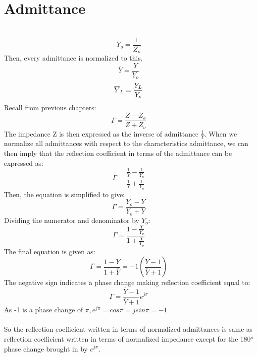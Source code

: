      \section{Admittance}\\
\begin{equation}
Y_o= \frac{1}{Z_o}
\end{equation}
Then, every admittance is normalized to this,
\begin{equation*}
\overline{Y} = \frac{Y}{Y_o} 
\end{equation*}
\begin{equation*}
\space  \overline{Y}_L = \frac{Y_L}{Y_o}
\end{equation*}
Recall from previous chapters:
\begin{equation*}
\Gamma = \frac{Z-Z_o}{Z+Z_o} 
\end{equation*}
The impedance Z is then expressed as the inverse of admittance $\frac{1}{Y}$. When we normalize all admittances with respect to the characteristics admittance, we can then imply that the reflection coefficient in terms of the admittance can be expressed as:
\begin{equation*}
\Gamma = \frac{\frac{1}{Y} - \frac{1}{Y_o}}{\frac{1}{Y} + \frac{1}{Y_o}}
\end{equation*}
Then, the equation is simplified to give:
\begin{equation}
\Gamma= \frac{Y_o - Y}{Y_o + Y} 
\end{equation}
Dividing the numerator and denominator by $Y_o$:
\begin{equation*}
  \Gamma= \frac{1 - \frac{Y}{Y_o}}{1 + \frac{Y}{Y_o}}
\end{equation*}
The final equation is given as:
\begin{equation*}
\Gamma= \frac{1 - \overline{Y}}{1 + \overline{Y}} = -1 (\frac{\overline{Y} - 1}{\overline{Y} + 1}) 
\end{equation*}
The negative sign indicates a phase change making reflection coefficient equal to:
\begin{equation}
 \Gamma = \frac{\overline{Y} - 1}{\overline{Y} + 1}e^{j\pi}
\end{equation}
As -1 is a phase change of $\pi, e^{j\pi}
 = cos\pi = jsin\pi = -1$\\\\
 So the reflection coefficient written in terms of normalized admittances is same as reflection coefficient written in terms of normalized impedance except for the 180$^o$ phase change brought in by $e^{j\pi}$.\\
